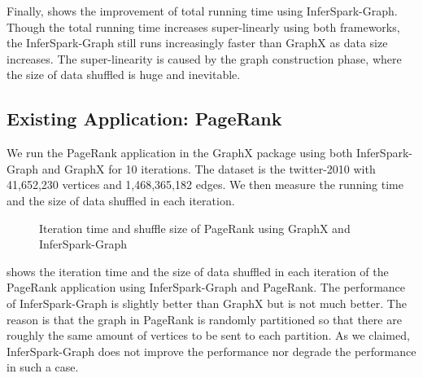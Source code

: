 Finally,  shows the improvement of
total running time using InferSpark-Graph. Though the total running time
increases super-linearly using both frameworks, the InferSpark-Graph still
runs increasingly faster than GraphX as data size increases. The
super-linearity is caused by the graph construction phase, where the size of
data shuffled is huge and inevitable.

\subsection{Existing Application: PageRank}

We run the PageRank application in the GraphX package using both
InferSpark-Graph and GraphX for 10 iterations. The dataset is the twitter-2010
 with 41,652,230 vertices and 1,468,365,182 edges. We
then measure the running time and the size of data shuffled in each iteration.

\begin{figure}[ht]
\centering
	\caption{Iteration time and shuffle size of PageRank using GraphX and InferSpark-Graph}
	\label{fig:pagerank_perf}
\end{figure}

 shows the iteration time and the size of data
shuffled in each iteration of the PageRank application using InferSpark-Graph
and PageRank. The performance of InferSpark-Graph is slightly better than
GraphX but is not much better. The reason is that the graph in PageRank is
randomly partitioned so that there are roughly the same amount of vertices
to be sent to each partition. As we claimed, InferSpark-Graph does not
improve the performance nor degrade the performance in such a case.

